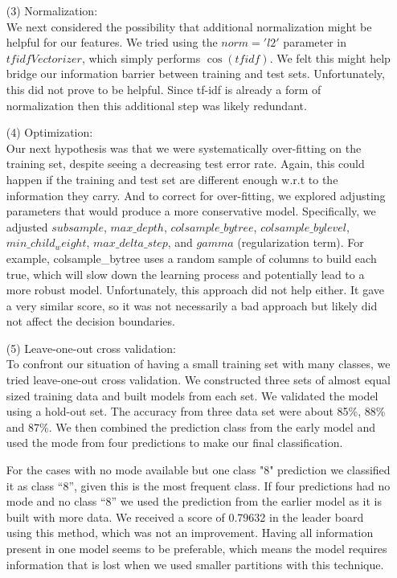 \documentclass[12pt]{article}
\newcommand\tab[1][0.5cm]{\hspace*{#1}}
\begin{document}
\begin{enumerate}
\item[(3)]
Normalization:\\
We next considered the possibility that additional normalization might be helpful for our features.  We tried using the $norm='l2'$ parameter in $tfidfVectorizer$, which simply performs $\cos{(tfidf)}$.  We felt this might help bridge our information barrier between training and test sets.  Unfortunately, this did not prove to be helpful. Since tf-idf is already a form of normalization then this additional step was likely redundant.   

\item[(4)]
Optimization:\\
\tab Our next hypothesis was that we were systematically over-fitting on the training set, despite seeing a decreasing test error rate.  Again, this could happen if the training and test set are different enough w.r.t to the information they carry.  And to correct for over-fitting, we explored adjusting parameters that would produce a more conservative model.  Specifically, we adjusted $subsample$, $max\_depth$, $colsample\_bytree$, $colsample\_bylevel$, $min\_child_weight$, $max\_delta\_step$, and $gamma$ (regularization term).  For example, colsample\_bytree uses a random sample of columns to build each true, which will slow down the learning process and potentially lead to a more robust model.  Unfortunately, this approach did not help either.  It gave a very similar score, so it was not necessarily a bad approach but likely did not affect the decision boundaries.

\item[(5)]
Leave-one-out cross validation:\\ 
\tab To confront our situation of having a small training set with many classes, we tried leave-one-out cross validation. We constructed three sets of almost equal sized training data and built models from each set. We validated the model using a hold-out set. The accuracy from three data set were about 85\%, 88\% and 87\%. We then combined the prediction class from the early model and used the mode from four predictions to make our final classification. 

\tab For the cases with no mode available but one class "8" prediction we classified it as class “8”, given this is the most frequent class. If four predictions had no mode and no class “8” we used the prediction from the earlier model as it is built with more data. We received a score of 0.79632 in the leader board using this method, which was not an improvement.  Having all information present in one model seems to be preferable, which means the model requires information that is lost when we used smaller partitions with this technique.


\end{enumerate}
\end{document}
